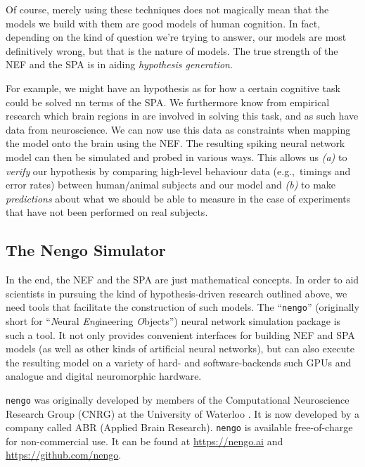 \documentclass[10pt,letterpaper,oneside]{article}
\begin{document}
Of course, merely using these techniques does not magically mean that the models we build with them are good models of human cognition. In fact, depending on the kind of question we're trying to answer, our models are most definitively wrong, but that is the nature of models. The true strength of the NEF and the SPA is in aiding \emph{hypothesis generation}.

For example, we might have an hypothesis as for how a certain cognitive task could be solved nn terms of the SPA. We furthermore know from empirical research which brain regions in are involved in solving this task, and as such have data from neuroscience. We can now use this data as constraints when mapping the model onto the brain using the NEF. The resulting spiking neural network model can then be simulated and probed in various ways. This allows us \emph{(a)} to \emph{verify} our hypothesis by comparing high-level behaviour data (e.g.,~timings and error rates) between human/animal subjects and our model and \emph{(b)} to make \emph{predictions} about what we should be able to measure in the case of experiments that have not been performed on real subjects.

\subsection{The Nengo Simulator}
In the end, the NEF and the SPA are just mathematical concepts. In order to aid scientists in pursuing the kind of hypothesis-driven research outlined above, we need tools that facilitate the construction of such models. The \enquote{\texttt{nengo}} (originally short for \enquote{\emph{N}eural \emph{Eng}ineering \emph{O}bjects}) neural network simulation package is such a tool. It not only provides convenient interfaces for building NEF and SPA models (as well as other kinds of artificial neural networks), but can also execute the resulting model on a variety of hard- and software-backends such GPUs and analogue and digital neuromorphic hardware.

\texttt{nengo} was originally developed by members of the Computational Neuroscience Research Group (CNRG) at the University of Waterloo \cite{bekolay2014nengo}. It is now developed by a company called ABR (Applied Brain Research). \texttt{nengo} is available free-of-charge for non-commercial use. It can be found at \url{https://nengo.ai} and \url{https://github.com/nengo}.

\end{document}
